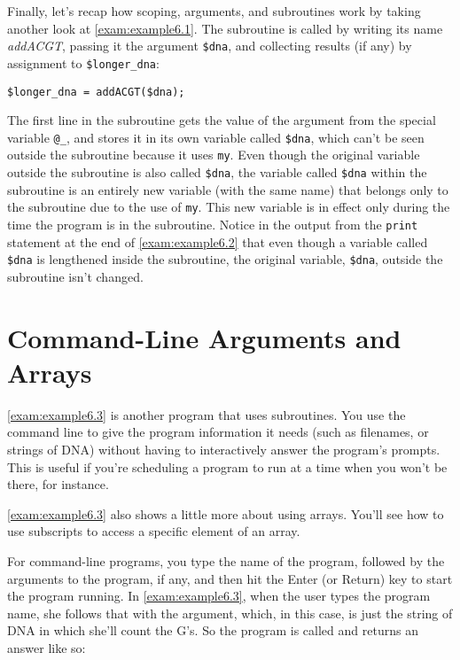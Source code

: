 Finally, let's recap how scoping, arguments, and subroutines work by taking another look at \autoref{exam:example6.1}. The subroutine is called by writing its name \textit{addACGT}, passing it the argument \verb|$dna|, and collecting results (if any) by assignment to \verb|$longer_dna|:

\begin{lstlisting}
$longer_dna = addACGT($dna); 
\end{lstlisting}

The first line in the subroutine gets the value of the argument from the special variable \verb|@_|, and stores it in its own variable called \verb|$dna|, which can't be seen outside the subroutine because it uses \verb|my|. Even though the original variable outside the subroutine is also called \verb|$dna|, the variable called \verb|$dna| within the subroutine is an entirely new variable (with the same name) that belongs only to the subroutine due to the use of \verb|my|. This new variable is in effect only during the time the program is in the subroutine. Notice in the output from the \verb|print| statement at the end of \autoref{exam:example6.2} that even though a variable called \verb|$dna| is lengthened inside the subroutine, the original variable, \verb|$dna|, outside the subroutine isn't changed. 

\section{Command-Line Arguments and Arrays}
\autoref{exam:example6.3} is another program that uses subroutines. You use the command line to give the program information it needs (such as filenames, or strings of DNA) without having to interactively answer the program's prompts. This is useful if you're scheduling a program to run at a time when you won't be there, for instance.

\autoref{exam:example6.3} also shows a little more about using arrays. You'll see how to use subscripts to access a specific element of an array.

For command-line programs, you type the name of the program, followed by the arguments to the program, if any, and then hit the Enter (or Return) key to start the program running. In \autoref{exam:example6.3}, when the user types the program name, she follows that with the argument, which, in this case, is just the string of DNA in which she'll count the G's. So the program is called and returns an answer like so:

